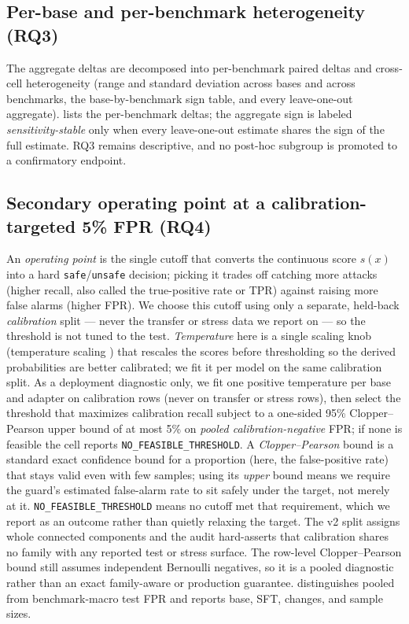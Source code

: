 \documentclass[11pt]{article}
\begin{document}
\subsection{Per-base and per-benchmark heterogeneity (RQ3)}
\label{subsec:heterogeneity}

The aggregate deltas are decomposed into per-benchmark paired deltas and cross-cell heterogeneity (range and standard deviation across bases and across benchmarks, the base-by-benchmark sign table, and every leave-one-out aggregate).  lists the per-benchmark deltas; the aggregate sign is labeled \emph{sensitivity-stable} only when every leave-one-out estimate shares the sign of the full estimate. RQ3 remains descriptive, and no post-hoc subgroup is promoted to a confirmatory endpoint.

\subsection{Secondary operating point at a calibration-targeted 5\% FPR (RQ4)}
\label{subsec:operating-point}

An \emph{operating point} is the single cutoff that converts the continuous score $s(x)$ into a hard \texttt{safe}/\texttt{unsafe} decision; picking it trades off catching more attacks (higher recall, also called the true-positive rate or TPR) against raising more false alarms (higher FPR). We choose this cutoff using only a separate, held-back \emph{calibration} split --- never the transfer or stress data we report on --- so the threshold is not tuned to the test. \emph{Temperature} here is a single scaling knob (temperature scaling \cite{guo2017calibration}) that rescales the scores before thresholding so the derived probabilities are better calibrated; we fit it per model on the same calibration split. As a deployment diagnostic only, we fit one positive temperature per base and adapter on calibration rows (never on transfer or stress rows), then select the threshold that maximizes calibration recall subject to a one-sided 95\% Clopper--Pearson upper bound of at most 5\% on \emph{pooled calibration-negative} FPR; if none is feasible the cell reports \texttt{NO\_FEASIBLE\_THRESHOLD}. A \emph{Clopper--Pearson} bound is a standard exact confidence bound for a proportion (here, the false-positive rate) that stays valid even with few samples; using its \emph{upper} bound means we require the guard's estimated false-alarm rate to sit safely under the target, not merely at it. \texttt{NO\_FEASIBLE\_THRESHOLD} means no cutoff met that requirement, which we report as an outcome rather than quietly relaxing the target. The v2 split assigns whole connected components and the audit hard-asserts that calibration shares no family with any reported test or stress surface. The row-level Clopper--Pearson bound still assumes independent Bernoulli negatives, so it is a pooled diagnostic rather than an exact family-aware or production guarantee.  distinguishes pooled from benchmark-macro test FPR and reports base, SFT, changes, and sample sizes.
\end{document}
